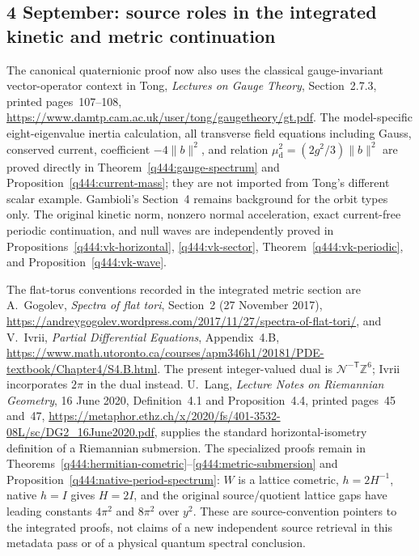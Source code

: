 \subsection*{4 September: source roles in the integrated kinetic and metric continuation}
The canonical quaternionic proof now also uses the classical
gauge-invariant vector-operator context in Tong, \emph{Lectures on Gauge
Theory}, Section~2.7.3, printed pages~107--108,
\url{https://www.damtp.cam.ac.uk/user/tong/gaugetheory/gt.pdf}.
The model-specific eight-eigenvalue inertia calculation, all transverse
field equations including Gauss, conserved current, coefficient
$-4\|b\|^2$, and relation $\mu_{\mathrm d}^2=(2g^2/3)\|b\|^2$
are proved directly in Theorem~\ref{q444:gauge-spectrum} and
Proposition~\ref{q444:current-mass}; they are not imported from Tong's
different scalar example. Gambioli's Section~4 remains background for the
orbit types only. The original kinetic norm, nonzero normal acceleration,
exact current-free periodic continuation, and null waves are independently
proved in Propositions~\ref{q444:vk-horizontal}, \ref{q444:vk-sector},
Theorem~\ref{q444:vk-periodic}, and Proposition~\ref{q444:vk-wave}.

The flat-torus conventions recorded in the integrated metric section are
A.~Gogolev, \emph{Spectra of flat tori}, Section~2 (27 November 2017),
\url{https://andreygogolev.wordpress.com/2017/11/27/spectra-of-flat-tori/},
and V.~Ivrii, \emph{Partial Differential Equations}, Appendix~4.B,
\url{https://www.math.utoronto.ca/courses/apm346h1/20181/PDE-textbook/Chapter4/S4.B.html}.
The present integer-valued dual is $\mathcal N^{-\mathsf T}\mathbb Z^6$;
Ivrii incorporates $2\pi$ in the dual instead. U.~Lang,
\emph{Lecture Notes on Riemannian Geometry}, 16 June 2020,
Definition~4.1 and Proposition~4.4, printed pages~45 and~47,
\url{https://metaphor.ethz.ch/x/2020/fs/401-3532-08L/sc/DG2_16June2020.pdf},
supplies the standard horizontal-isometry definition of a Riemannian
submersion. The specialized proofs remain in
Theorems~\ref{q444:hermitian-cometric}--\ref{q444:metric-submersion}
and Proposition~\ref{q444:native-period-spectrum}: $W$ is a lattice
cometric, $h=2H^{-1}$, native $h=I$ gives $H=2I$, and the original
source/quotient lattice gaps have leading constants $4\pi^2$ and
$8\pi^2$ over $y^2$. These are source-convention pointers to the
integrated proofs, not claims of a new independent source retrieval in
this metadata pass or of a physical quantum spectral conclusion.

